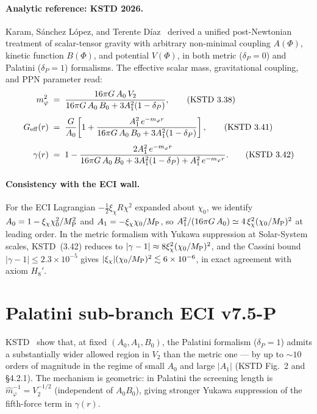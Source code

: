 \documentclass[aps,prl,twocolumn,showpacs,superscriptaddress]{revtex4-2}
\newcommand{\MP}{M_{\rm P}}
\begin{document}
\paragraph{Analytic reference: KSTD 2026.}
Karam, S\'anchez L\'opez, and Terente D\'iaz~\cite{KSTD26}
derived a unified post-Newtonian treatment of scalar-tensor
gravity with arbitrary non-minimal coupling $A(\Phi)$, kinetic
function $B(\Phi)$, and potential $V(\Phi)$, in both metric
($\delta_P = 0$) and Palatini ($\delta_P = 1$) formalisms.
The effective scalar mass, gravitational coupling, and PPN
parameter read:
\begin{align}
  m_\varphi^2 &\;=\; \frac{16\pi G\,A_0\,V_2}
                     {16\pi G\,A_0\,B_0 + 3A_1^2(1-\delta_P)},
  \tag{KSTD~3.38}\\[4pt]
  G_{\rm eff}(r) &\;=\; \frac{G}{A_0}\!
    \left[1 + \frac{A_1^2\,e^{-m_\varphi r}}
                   {16\pi G\,A_0\,B_0 + 3A_1^2(1-\delta_P)}\right],
  \tag{KSTD~3.41}\\[4pt]
  \gamma(r) &\;=\; 1 - \frac{2A_1^2\,e^{-m_\varphi r}}
    {16\pi G\,A_0\,B_0 + 3A_1^2(1-\delta_P) + A_1^2\,e^{-m_\varphi r}}.
  \tag{KSTD~3.42}
\end{align}

\paragraph{Consistency with the ECI wall.}
For the ECI Lagrangian $-\tfrac{1}{2}\xi_\chi R\chi^2$ expanded
about $\chi_0$, we identify $A_0 = 1 - \xi_\chi\chi_0^2/\MP^2$
and $A_1 = -\xi_\chi\chi_0/\MP$, so
$A_1^2/(16\pi G\,A_0) \simeq 4\,\xi_\chi^2(\chi_0/\MP)^2$
at leading order.  In the metric formalism with Yukawa suppression
at Solar-System scales, KSTD~(3.42) reduces to
$|\gamma-1| \approx 8\xi_\chi^2(\chi_0/\MP)^2$, and the Cassini
bound $|\gamma-1|\le 2.3\times 10^{-5}$ gives
$|\xi_\chi|(\chi_0/\MP)^2 \lesssim 6\times 10^{-6}$, in exact
agreement with axiom $H_8'$.

\section{Palatini sub-branch ECI v7.5-P}
\label{sec:palatini}

KSTD~\cite{KSTD26} show that, at fixed $(A_0, A_1, B_0)$, the
Palatini formalism ($\delta_P = 1$) admits a substantially wider
allowed region in $V_2$ than the metric one --- by up to $\sim 10$
orders of magnitude in the regime of small $A_0$ and large
$|A_1|$ (KSTD Fig.~2 and \S 4.2.1).  The mechanism is geometric:
in Palatini the screening length is
$\hat{m}_\varphi^{-1} = V_2^{-1/2}$ (independent of $A_0 B_0$),
giving stronger Yukawa suppression of the fifth-force term in
$\gamma(r)$.
\end{document}
